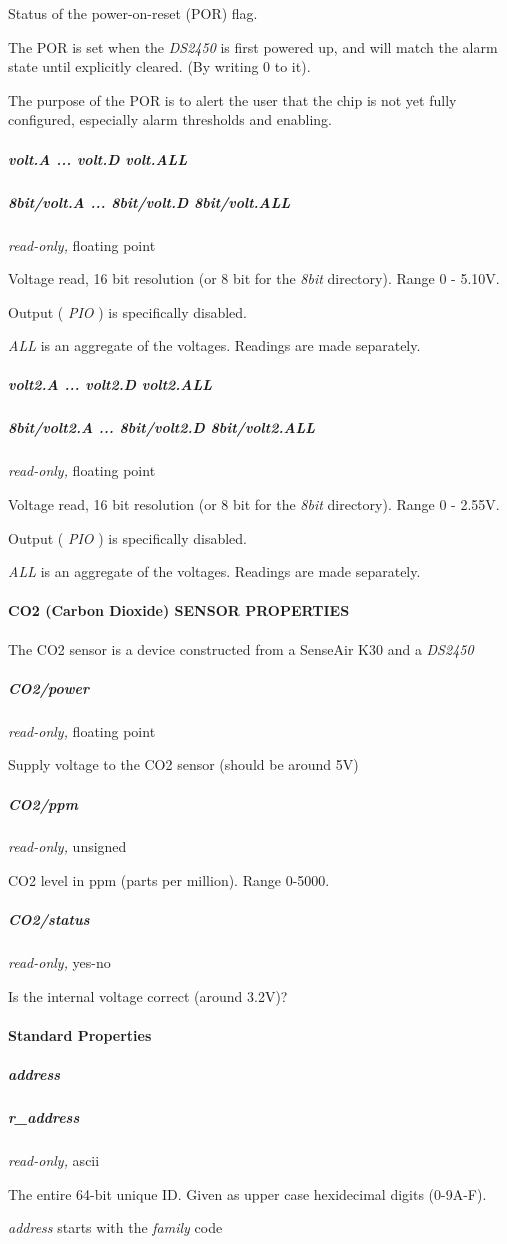 Status of the power-on-reset (POR) flag. 

The POR is set when the \textit{DS2450} is first powered up, and will match the
alarm state until explicitly cleared. (By writing 0 to it). 

The purpose of the POR is to alert the user that the chip is not yet fully
configured, especially alarm thresholds and enabling. 
\subparagraph*{volt.A ... volt.D volt.ALL}
\subparagraph*{8bit/volt.A
... 8bit/volt.D 8bit/volt.ALL}\textit{read-only,} floating point 

Voltage read, 16 bit resolution (or 8 bit for the  \textit{8bit} directory). Range
0 - 5.10V. 

Output ( \textit{PIO} ) is specifically disabled. 

\textit{ALL} is an aggregate of the voltages. Readings are made separately. 
\subparagraph*{volt2.A
... volt2.D volt2.ALL}
\subparagraph*{8bit/volt2.A ... 8bit/volt2.D 8bit/volt2.ALL}\textit{read-only,} floating
point 

Voltage read, 16 bit resolution (or 8 bit for the  \textit{8bit} directory). Range
0 - 2.55V. 

Output ( \textit{PIO} ) is specifically disabled. 

\textit{ALL} is an aggregate of the voltages. Readings are made separately. 
\paragraph*{CO2 (Carbon
Dioxide) SENSOR PROPERTIES}
The CO2 sensor is a device constructed from a
SenseAir K30 and a \textit{DS2450} 
\subparagraph*{CO2/power}\textit{read-only,} floating point 

Supply voltage to the CO2 sensor (should be around 5V) 
\subparagraph*{CO2/ppm}\textit{read-only,}
unsigned 

CO2 level in ppm (parts per million). Range 0-5000. 
\subparagraph*{CO2/status}\textit{read-only,} yes-no


Is the internal voltage correct (around 3.2V)? 
\paragraph*{Standard Properties}
     
    
\subparagraph*{address}
\subparagraph*{r\_address}\textit{read-only,} ascii 

The entire 64-bit unique ID. Given as upper case hexidecimal digits (0-9A-F).


\textit{address} starts with the \textit{family} code 


